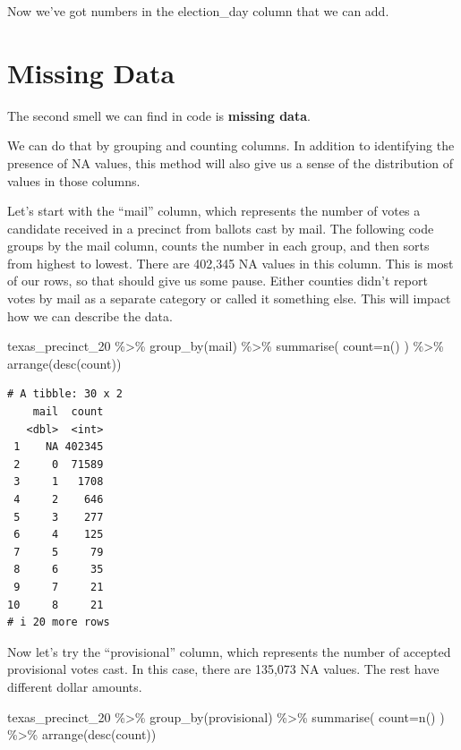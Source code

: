 \documentclass[
  letterpaper,
  DIV=11,
  numbers=noendperiod]{scrreprt}
\newenvironment{Shaded}{\begin{snugshade}}{\end{snugshade}}
\newcommand{\AttributeTok}[1]{\textcolor[rgb]{0.40,0.45,0.13}{#1}}
\newcommand{\FunctionTok}[1]{\textcolor[rgb]{0.28,0.35,0.67}{#1}}
\newcommand{\NormalTok}[1]{\textcolor[rgb]{0.00,0.23,0.31}{#1}}
\newcommand{\SpecialCharTok}[1]{\textcolor[rgb]{0.37,0.37,0.37}{#1}}
\begin{document}
Now we've got numbers in the election\_day column that we can add.

\hypertarget{missing-data}{%
\section{Missing Data}\label{missing-data}}

The second smell we can find in code is \textbf{missing data}.

We can do that by grouping and counting columns. In addition to
identifying the presence of NA values, this method will also give us a
sense of the distribution of values in those columns.

Let's start with the ``mail'' column, which represents the number of
votes a candidate received in a precinct from ballots cast by mail. The
following code groups by the mail column, counts the number in each
group, and then sorts from highest to lowest. There are 402,345 NA
values in this column. This is most of our rows, so that should give us
some pause. Either counties didn't report votes by mail as a separate
category or called it something else. This will impact how we can
describe the data.

\begin{Shaded}
\begin{Highlighting}[]
\NormalTok{texas\_precinct\_20 }\SpecialCharTok{\%\textgreater{}\%}
  \FunctionTok{group\_by}\NormalTok{(mail) }\SpecialCharTok{\%\textgreater{}\%}
  \FunctionTok{summarise}\NormalTok{(}
    \AttributeTok{count=}\FunctionTok{n}\NormalTok{()}
\NormalTok{  ) }\SpecialCharTok{\%\textgreater{}\%}
  \FunctionTok{arrange}\NormalTok{(}\FunctionTok{desc}\NormalTok{(count))}
\end{Highlighting}
\end{Shaded}

\begin{verbatim}
# A tibble: 30 x 2
    mail  count
   <dbl>  <int>
 1    NA 402345
 2     0  71589
 3     1   1708
 4     2    646
 5     3    277
 6     4    125
 7     5     79
 8     6     35
 9     7     21
10     8     21
# i 20 more rows
\end{verbatim}

Now let's try the ``provisional'' column, which represents the number of
accepted provisional votes cast. In this case, there are 135,073 NA
values. The rest have different dollar amounts.

\begin{Shaded}
\begin{Highlighting}[]
\NormalTok{texas\_precinct\_20 }\SpecialCharTok{\%\textgreater{}\%}
  \FunctionTok{group\_by}\NormalTok{(provisional) }\SpecialCharTok{\%\textgreater{}\%}
  \FunctionTok{summarise}\NormalTok{(}
    \AttributeTok{count=}\FunctionTok{n}\NormalTok{()}
\NormalTok{  ) }\SpecialCharTok{\%\textgreater{}\%}
  \FunctionTok{arrange}\NormalTok{(}\FunctionTok{desc}\NormalTok{(count))}
\end{Highlighting}
\end{Shaded}
\end{document}
